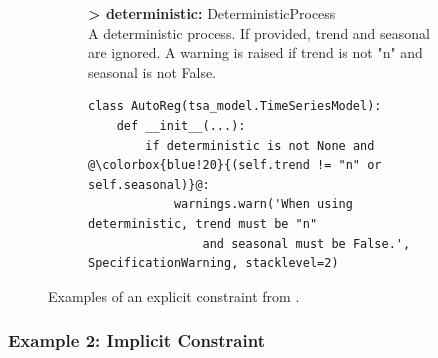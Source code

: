 \begin{figure}[t]
	\vspace{2mm}
    \begin{subfigure}{\linewidth}
        \begin{tcolorbox}[colback=Emerald!10,colframe=cyan!40!black,title=\textbf{Constraint description of \texttt{trend} and \texttt{seasonal} in class \texttt{AutoReg}}]
            {\sffamily \textbf{> deterministic: } DeterministicProcess
            \\
            A deterministic process. If provided, trend and seasonal are ignored. \colorbox{blue!20}{A warning is raised if} \colorbox{blue!20}{trend is not "n" and seasonal is not False.}}
        \end{tcolorbox}
        \label{fig:eg1-doc}
    \end{subfigure}
    \begin{subfigure}{\linewidth}
\begin{tcolorbox}[colback=Salmon!20, colframe=Salmon!90!Black,title=\textbf{Corresponding code snippet in class \texttt{AutoReg}}]
\begin{lstlisting}[escapechar=@]
class AutoReg(tsa_model.TimeSeriesModel):
    def __init__(...):
        if deterministic is not None and @\colorbox{blue!20}{(self.trend != "n" or self.seasonal)}@:
            warnings.warn('When using deterministic, trend must be "n"
                and seasonal must be False.', SpecificationWarning, stacklevel=2)
\end{lstlisting}
\end{tcolorbox}
        \label{fig:eg1-code}
    \end{subfigure}
    \caption{Examples of an explicit constraint from .}
    \label{fig:eg1}
    \vspace{-5pt}
\end{figure}



\subsubsection{Example 2: Implicit Constraint}\label{sec:eg2-mpchecker}

